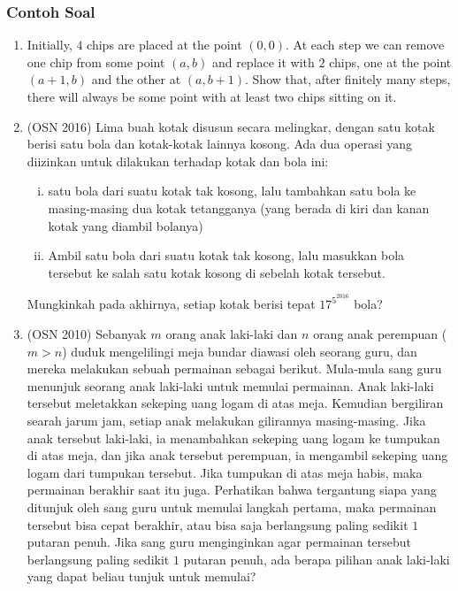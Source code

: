 \documentclass[11pt]{scrartcl}
\begin{document}
\subsubsection{Contoh Soal}
\begin{enumerate}
    \item Initially, $4$ chips are placed at the point $(0, 0)$. At each step we can remove one chip from some point $(a, b)$ and replace it with $2$ chips, one at the point $(a + 1, b)$ and the other at $(a, b + 1)$. Show that, after finitely many steps, there will always be some point with at least two chips sitting on it.
    \item (OSN 2016) Lima buah kotak disusun secara melingkar, dengan satu kotak berisi satu bola dan kotak-kotak lainnya kosong. Ada dua operasi yang diizinkan untuk dilakukan terhadap kotak dan bola ini:
    \begin{enumerate}[(i)]
        \item  satu bola dari suatu kotak tak kosong, lalu tambahkan satu bola ke masing-masing dua kotak tetangganya (yang berada di kiri dan kanan kotak yang diambil bolanya)
        \item Ambil satu bola dari suatu kotak tak kosong, lalu masukkan bola tersebut ke salah satu kotak kosong di sebelah kotak tersebut.
    \end{enumerate}
    Mungkinkah pada akhirnya, setiap kotak berisi tepat $17^{5^{2016}}$ bola?

    \item (OSN 2010) Sebanyak $m$ orang anak laki-laki dan $n$ orang anak perempuan ($m > n$) duduk mengelilingi meja bundar diawasi oleh seorang guru, dan mereka melakukan sebuah permainan sebagai berikut. Mula-mula sang guru menunjuk seorang anak laki-laki untuk memulai permainan. Anak laki-laki tersebut meletakkan sekeping uang logam di atas meja. Kemudian bergiliran searah jarum jam, setiap anak melakukan gilirannya masing-masing. Jika anak tersebut laki-laki, ia menambahkan sekeping uang logam ke tumpukan di atas meja, dan jika anak tersebut perempuan, ia mengambil sekeping uang logam dari tumpukan tersebut. Jika tumpukan di atas meja habis, maka permainan berakhir saat itu juga. Perhatikan bahwa tergantung siapa yang ditunjuk oleh sang guru untuk memulai langkah pertama, maka permainan tersebut bisa cepat berakhir, atau bisa saja berlangsung paling sedikit $1$ putaran penuh.
    Jika sang guru menginginkan agar permainan tersebut berlangsung paling sedikit $1$ putaran penuh, ada berapa pilihan anak laki-laki yang dapat beliau tunjuk untuk memulai?
\end{enumerate}
\end{document}
